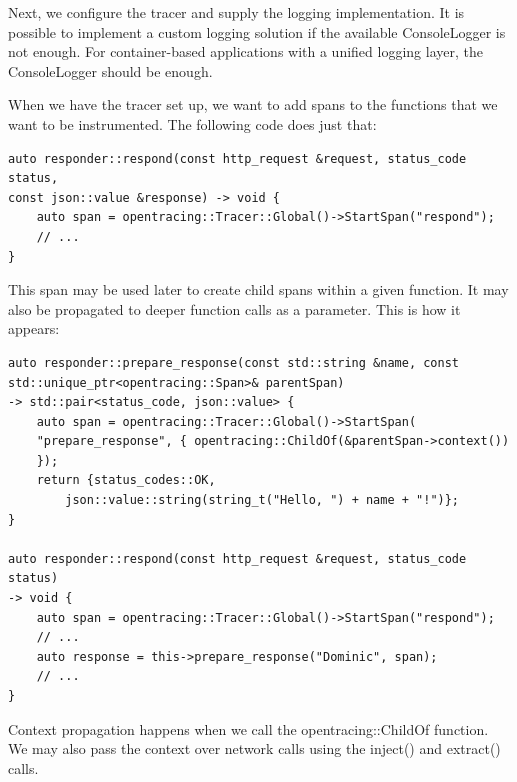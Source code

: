 Next, we configure the tracer and supply the logging implementation. It is possible to implement a custom logging solution if the available ConsoleLogger is not enough. For container-based applications with a unified logging layer, the ConsoleLogger should be enough.

When we have the tracer set up, we want to add spans to the functions that we want to be instrumented. The following code does just that:

\begin{lstlisting}[style=styleCXX]
auto responder::respond(const http_request &request, status_code status,
const json::value &response) -> void {
	auto span = opentracing::Tracer::Global()->StartSpan("respond");
	// ...
}
\end{lstlisting}

This span may be used later to create child spans within a given function. It may also be propagated to deeper function calls as a parameter. This is how it appears:

\begin{lstlisting}[style=styleCXX]
auto responder::prepare_response(const std::string &name, const
std::unique_ptr<opentracing::Span>& parentSpan)
-> std::pair<status_code, json::value> {
	auto span = opentracing::Tracer::Global()->StartSpan(
	"prepare_response", { opentracing::ChildOf(&parentSpan->context())
	});
	return {status_codes::OK,
		json::value::string(string_t("Hello, ") + name + "!")};
}

auto responder::respond(const http_request &request, status_code status)
-> void {
	auto span = opentracing::Tracer::Global()->StartSpan("respond");
	// ...
	auto response = this->prepare_response("Dominic", span);
	// ...
}
\end{lstlisting}

Context propagation happens when we call the opentracing::ChildOf function. We may also pass the context over network calls using the inject() and extract() calls.













